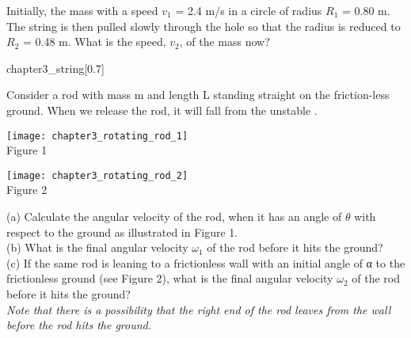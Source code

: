 \begin{example}
	Initially, the mass  with a speed $v_1$ = 2.4 m/s in
	a circle of radius $R_1$ = 0.80 m.
	The string is then pulled slowly through the hole so
	that the radius is reduced to $R_2$ = 0.48 m. What is the
	speed, $v_2$, of the mass now?
	\begin{singlefigure}{chapter3_string}[0.7]
	\end{singlefigure}
\end{example}
\begin{example}
	Consider a rod with mass m and length L standing straight on the friction-less ground. When we
	release the rod, it will fall from the unstable .
	\begin{center}
		\begin{minipage}{0.45\textwidth}
			\centering
			\texttt{[image: chapter3\_rotating\_rod\_1]}\\
			Figure 1
		\end{minipage}
		\quad
		\begin{minipage}{0.45\textwidth}
			\centering
			\texttt{[image: chapter3\_rotating\_rod\_2]}\\
			Figure 2
		\end{minipage}
	\end{center}
	(a) Calculate the angular velocity of the rod, when it has an angle of $\theta$ with respect to the ground
	as illustrated in Figure 1.\\
	(b) What is the final angular velocity $\omega_1$ of the rod before it hits the ground?\\
	(c) If the same rod is leaning to a frictionless wall with an initial angle of α to the frictionless
	ground (see Figure 2), what is the final angular velocity $\omega_2$ of the rod before it hits the ground?\\
	{\em Note that there is a possibility that the right end of the rod leaves from the wall before the rod hits the ground.}
\end{example}